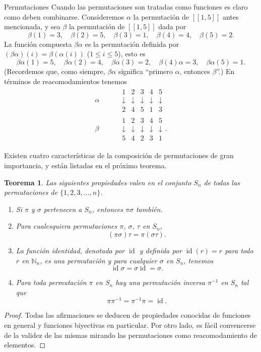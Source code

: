 \documentclass[11pt,spanish,makeidx]{amsbook}
\newtheorem{teorema}{Teorema}[section]
\theoremstyle{definition}
\theoremstyle{remark}
\begin{document}
\begin{section}{Permutaciones}
Cuando las permutaciones son tratadas como funciones es claro como deben combinarse. Consideremos $\alpha$ la permutación de $[[1,5]]$ antes mencionada, y sea $\beta$ la permutación de $[[1,5]]$ dada por 
$$
\beta(1)=3,\quad \beta(2)=5,\quad \beta(3)=1,\quad
\beta(4)=4,\quad \beta(5)=2.
$$
La función compuesta $\beta\alpha$ es la permutación definida por $(\beta\alpha)(i)= \beta(\alpha(i))$ ($1\le i\le 5$), esto es 
$$
\beta\alpha(1)=5,\quad \beta\alpha(2)=4,\quad
\beta\alpha(3)=2,\quad \beta(4)\alpha=3,\quad \beta\alpha(5)=1.
$$
(Recordemos que, como siempre, $\beta\alpha$ significa ``primero $\alpha$, entonces $\beta$''.) En términos de reacomodamientos tenemos
$$\begin{aligned}
\alpha\quad&\quad\begin{matrix} 1&2&3&4&5 \\
\downarrow&\downarrow&\downarrow&\downarrow&\downarrow\\2 &4 &5 &1
& 3
\end{matrix} \\
\beta \quad&\quad \begin{matrix} 1&2&3&4&5 \\
\downarrow&\downarrow&\downarrow&\downarrow&\downarrow\\5 &4 &2 &3
& 1
\end{matrix}.
 \end{aligned}
$$

Existen cuatro características de la composición de permutaciones de gran importancia, y están listadas en el próximo teorema.

\begin{teorema}\label{tA3} Las siguientes propiedades valen en el conjunto $S_n$ de todas las permutaciones de $\{1,2,3,...,n\}$.
\begin{enumerate}
\item[(i)] Si $\pi$ y $\sigma$ pertenecen a $S_n$, entonces $\pi\sigma$ también.
\item[(ii)] Para cualesquiera permutaciones $\pi$, $\sigma$, $\tau$ en $S_n$,
$$
(\pi\sigma)\tau=\pi(\sigma\tau).$$
\item[(iii)] La función identidad, denotada por $\operatorname{id}$ y definida por $\operatorname{id}(r) =r$ para todo $r$ en $\mathbb N_n$, es una permutación y para cualquier $\sigma$ en $S_n$,
tenemos
$$
\operatorname{id}\sigma=\sigma\operatorname{id}=\sigma.$$
\item[(iv)] Para toda permutación $\pi$ en $S_n$ hay una permutación inversa $\pi^{-1}$ en $S_n$ tal que
$$
\pi\pi^{-1} = \pi^{-1}\pi = \operatorname{id}.
$$
\end{enumerate}
\end{teorema}
\begin{proof} Todas las afirmaciones se deducen de propiedades conocidas de funciones en general y funciones biyectivas en particular. Por otro lado, es fácil convencerse de la validez de las mismas mirando las permutaciones como reacomodamiento de elementos. 
\end{proof}


\end{section}
\end{document}
